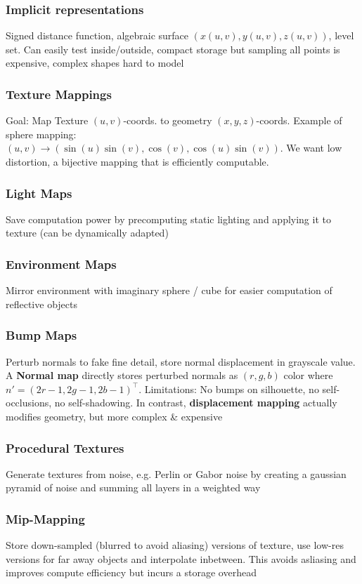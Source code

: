 \documentclass[a4paper,10pt]{article}
\begin{document}
\subsubsection{Implicit representations} Signed distance function, algebraic surface \( (x(u,v), y(u,v), z(u,v)) \), level set. Can easily test inside/outside, compact storage but sampling all points is expensive, complex shapes hard to model
\subsubsection{Texture Mappings} Goal: Map Texture \( (u,v) \)-coords. to geometry \( (x,y,z) \)-coords. Example of sphere mapping: \\\( (u,v) \to (\sin (u) \sin (v), \cos (v), \cos (u) \sin (v)) \). We want low distortion, a bijective mapping that is efficiently computable.
\subsubsection{Light Maps} Save computation power by precomputing static lighting and applying it to texture (can be dynamically adapted)
\subsubsection{Environment Maps} Mirror environment with imaginary sphere / cube for easier computation of reflective objects
\subsubsection{Bump Maps} Perturb normals to fake fine detail, store normal displacement in grayscale value. A \textbf{Normal map} directly stores perturbed normals as \( (r,g,b) \) color where \( n' = (2r - 1, 2g - 1, 2b -1)^\top \). Limitations: No bumps on silhouette, no self-occlusions, no self-shadowing. In contrast, \textbf{displacement mapping} actually modifies geometry, but more complex \& expensive
\subsubsection{Procedural Textures} Generate textures from noise, e.g. Perlin or Gabor noise by creating a gaussian pyramid of noise and summing all layers in a weighted way
\subsubsection{Mip-Mapping} Store down-sampled (blurred to avoid aliasing) versions of texture, use low-res versions for far away objects and interpolate inbetween. This avoids asliasing and improves compute efficiency but incurs a storage overhead
\end{document}
